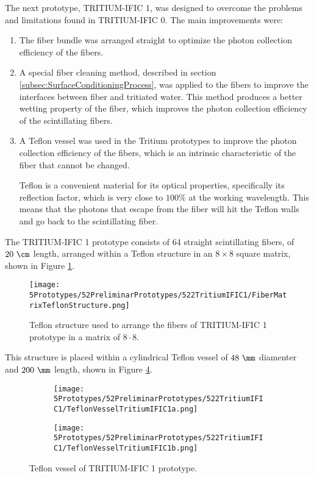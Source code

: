The next prototype, TRITIUM-IFIC 1, was designed to overcome the problems and limitations found in TRITIUM-IFIC 0. The main improvements were:

\begin{enumerate}

\item{} The fiber bundle was arranged straight to optimize the photon collection efficiency of the fibers.

\item{} A special fiber cleaning method, described in section \ref{subsec:SurfaceConditioningProcess}, was applied to the fibers to improve the interfaces between fiber and tritiated water. This method produces a better wetting property of the fiber, which improves the photon collection efficiency of the scintillating fibers.

\item{} A Teflon vessel was used in the Tritium prototypes to improve the photon collection efficiency of the fibers, which is an intrinsic characteristic of the fiber that cannot be changed.

Teflon is a convenient material for its optical properties, specifically its reflection factor, which is very close to $100\%$ at the working wavelength. This means that the photons that escape from the fiber will hit the Teflon walls and go back to the scintillating fiber.

\end{enumerate}

The TRITIUM-IFIC 1 prototype consists of 64 straight scintillating fibers, of $20~\cm$ length, arranged within a Teflon structure in an $8\times 8$ square matrix, shown in Figure \ref{fig:TeflonStructureFibersTritiumIFIC1}.

\begin{figure}[h]
\centering
\texttt{[image: 5Prototypes/52PreliminarPrototypes/522TritiumIFIC1/FiberMatrixTeflonStructure.png]}
\caption{Teflon structure used to arrange the fibers of TRITIUM-IFIC 1 prototype in a matrix of $8\cdot{}8$.\label{fig:TeflonStructureFibersTritiumIFIC1}}
\end{figure}
This structure is placed within a cylindrical Teflon vessel of $48~\mm$ diamenter and $200~\mm$ length, shown in Figure \ref{fig:TeflonVesselTritumIFIC1}. 

\begin{figure}
\centering
    \begin{subfigure}[b]{0.30\textwidth}
    \centering
    \texttt{[image: 5Prototypes/52PreliminarPrototypes/522TritiumIFIC1/TeflonVesselTritiumIFIC1a.png]}  
    \caption{\label{subfig:TeflonVesselTritumIFIC1a}}
    \end{subfigure}
    \hfill
    \begin{subfigure}[b]{0.45\textwidth}
    \centering
    \texttt{[image: 5Prototypes/52PreliminarPrototypes/522TritiumIFIC1/TeflonVesselTritiumIFIC1b.png]}  
    \caption{\label{subfig:TeflonVesselTritumIFIC1b}}
    \end{subfigure}
 \caption{Teflon vessel of TRITIUM-IFIC 1 prototype.}
 \label{fig:TeflonVesselTritumIFIC1}
\end{figure}

